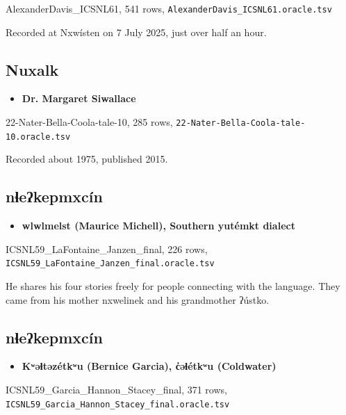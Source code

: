 AlexanderDavis\_ICSNL61, 541 rows, \texttt{Alexander\allowbreak{}Davis\_\allowbreak{}ICSNL61.\allowbreak{}oracle.\allowbreak{}tsv}

Recorded at Nxwísten on 7 July 2025, just over half an hour.

\subsection{Nuxalk}

\begin{itemize}
\item \textbf{Dr. Margaret Siwallace}
\end{itemize}

22-Nater-Bella-Coola-tale-10, 285 rows, \texttt{22-\allowbreak{}Nater-\allowbreak{}Bella-\allowbreak{}Coola-\allowbreak{}tale-\allowbreak{}10.\allowbreak{}oracle.\allowbreak{}tsv}

Recorded about 1975, published 2015.

\subsection{nɬeʔkepmxcín}

\begin{itemize}
\item \textbf{wlwlmelst (Maurice Michell), Southern yutémkt dialect}
\end{itemize}

ICSNL59\_LaFontaine\_Janzen\_final, 226 rows, \texttt{ICSNL59\_\allowbreak{}La\allowbreak{}Fontaine\_\allowbreak{}Janzen\_\allowbreak{}final.\allowbreak{}oracle.\allowbreak{}tsv}

He shares his four stories freely for people connecting with the language. They came from his mother nxwelinek and his grandmother ʔústko.

\subsection{nɬeʔkepmxcín}

\begin{itemize}
\item \textbf{Kʷəɬtəzétkʷu (Bernice Garcia), c̓əɬétkʷu (Coldwater)}
\end{itemize}

ICSNL59\_Garcia\_Hannon\_Stacey\_final, 371 rows, \texttt{ICSNL59\_\allowbreak{}Garcia\_\allowbreak{}Hannon\_\allowbreak{}Stacey\_\allowbreak{}final.\allowbreak{}oracle.\allowbreak{}tsv}

